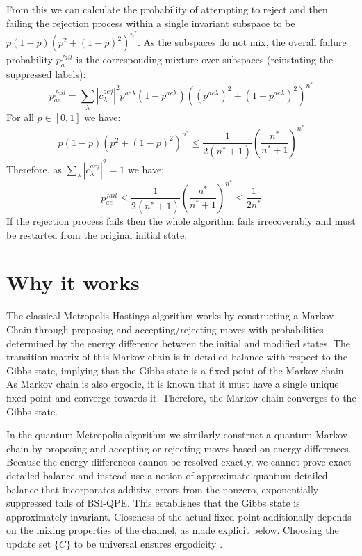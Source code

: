 \documentclass[aps,floatfix,10pt,amssymb,amsfont,amsmath,superscriptaddress,float,nofootinbib,longbibliography,nobalancelastpage,twocolumn]{revtex4-2}
\begin{document}
From this we can calculate the probability of attempting to reject and then failing the rejection process within a single invariant subspace to be $p(1-p)(p^2 +(1-p)^2)^{n^*}$. As the subspaces do not mix, the overall failure probability $p_a^{fail}$ is the corresponding mixture over subspaces (reinstating the suppressed labels):
\begin{equation}
   p_{ae}^{fail} =  \sum_{\lambda}|c^{aej}_{\lambda}|^2p^{ae\lambda}(1-p^{ae\lambda})((p^{ae\lambda})^2 +(1-p^{ae\lambda})^2)^{n^*}
\end{equation}
For all $p \in [0,1]$ we have: 
\begin{equation}
    p(1-p)(p^2 +(1-p)^2)^{n^*} \leq \frac{1}{2(n^*+1)} \left(\frac{n^*}{n^*+1}\right)^{n^*}
\end{equation}
Therefore, as $\sum_{\lambda}|c^{aej}_{\lambda}|^2=1$ we have:
\begin{equation}
    \label{eq:probabilty_of_rejection}
   p_{ae}^{fail} \leq \frac{1}{2(n^*+1)} \left(\frac{n^*}{n^*+1}\right)^{n^*} \leq \frac{1}{2n^*}
\end{equation}
If the rejection process fails then the whole algorithm fails irrecoverably and must be restarted from the original initial state.

\label{section:rejection}

\section{Why it works}
\label{section:why}
The classical Metropolis-Hastings algorithm works by constructing a Markov Chain through proposing and accepting/rejecting moves with probabilities determined by the energy difference between the initial and modified states. The transition matrix of this Markov chain is in detailed balance with respect to the Gibbs state, implying that the Gibbs state is a fixed point of the Markov chain. As Markov chain is also ergodic, it is known that it must have a single unique fixed point and converge towards it. Therefore, the Markov chain converges to the Gibbs state.

In the quantum Metropolis algorithm we similarly construct a quantum Markov chain by proposing and accepting or rejecting moves based on energy differences. Because the energy differences cannot be resolved exactly, we cannot prove exact detailed balance and instead use a notion of approximate quantum detailed balance that incorporates additive errors from the nonzero, exponentially suppressed tails of BSI-QPE. This establishes that the Gibbs state is approximately invariant. Closeness of the actual fixed point additionally depends on the mixing properties of the channel, as made explicit below. Choosing the update set $\{C\}$ to be universal ensures ergodicity \cite{Temme_2011}.
\end{document}
